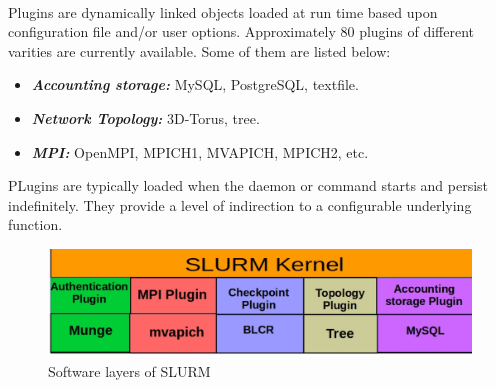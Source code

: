 \documentclass[a4paper, 12pt]{article}
\begin{document}
\noindent
\\
Plugins are dynamically linked objects loaded at run time based upon configuration file and/or user options. Approximately $80$ plugins of different varities are currently available. Some of them are listed below:\\
\begin{itemize}
\item \textbf{\textit{Accounting storage:}} MySQL, PostgreSQL, textfile.
\item \textbf{\textit{Network Topology:}} 3D-Torus, tree.
\item \textbf{\textit{MPI:}} OpenMPI, MPICH1, MVAPICH, MPICH2, etc.
\end{itemize} 
PLugins are typically loaded when the daemon or command starts and persist indefinitely. They provide a level of indirection to a configurable underlying function.
\begin{figure}[h]
\centering
\includegraphics[width=1.0\textwidth]{./plugin.eps}
\vspace{-0.15in}
\caption{Software layers of SLURM}
\label{fig:6}
\end{figure}
\end{document}
